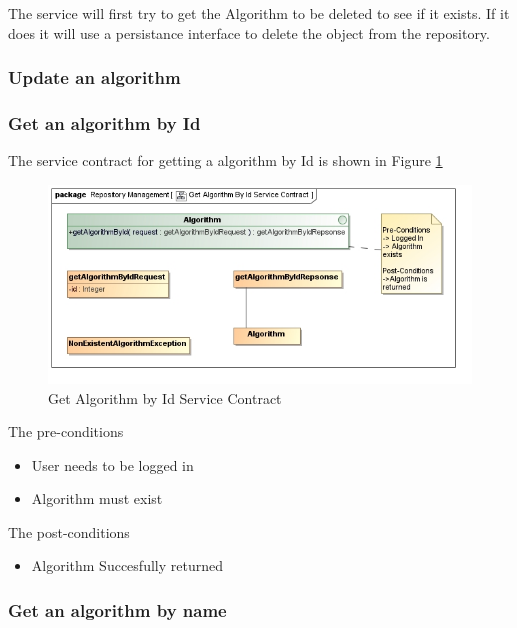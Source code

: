  The service will first try to get the Algorithm to be deleted to see if it
 exists. If it does it will use a persistance interface to delete the object
 from the repository.

\subsubsection {Update an algorithm}
\subsubsection {Get an algorithm by Id}
The service contract for getting a algorithm by Id is shown in Figure \ref{fig:getAlgoByIdService}
\begin{figure}[H]
  \begin{center}
  \includegraphics[scale=0.6]{../Diagrams and Charts/Test Data/Get Algorithm By Id Service Contract.jpg}
  \caption{Get Algorithm by Id Service Contract}
  \label{fig:getAlgoByIdService}
  \end{center}
  
\end{figure}

The pre-conditions
\begin{itemize}
  \item User needs to be logged in
  \item Algorithm must exist
\end{itemize}

The post-conditions
\begin{itemize}
  \item Algorithm Succesfully returned
\end{itemize}

\subsubsection {Get an algorithm by name}
